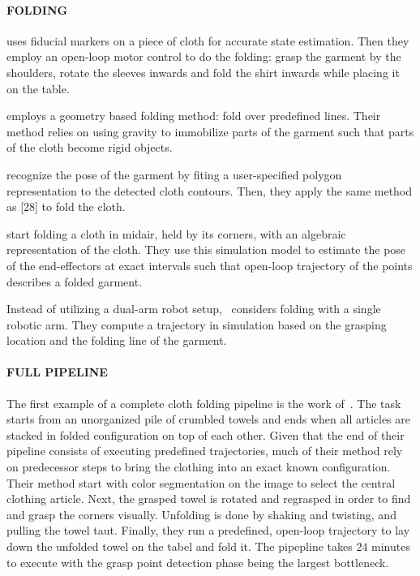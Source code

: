 \documentclass[\home/main.tex]{subfiles}
\begin{document}
    \paragraph{FOLDING}
	\autocite{Bersch2011} uses fiducial markers on a piece of cloth for accurate state estimation. Then they employ an open-loop motor control to do the folding: grasp the garment by the shoulders, rotate the sleeves inwards and fold the shirt inwards while placing it on the table. 

	\autocite{Berg2010} employs a geometry based folding method: fold over predefined lines. Their method relies on using gravity to immobilize parts of the garment such that parts of the cloth become rigid objects. 

	\autocite{Miller2012} recognize the pose of the garment by fiting a user-specified polygon representation to the detected cloth contours. Then, they apply the same method as [28] to fold the cloth.

	\autocite{Yamakawa2011} start folding a cloth in midair, held by its corners, with an algebraic representation of the cloth. They use this simulation model to estimate the pose of the end-effectors at exact intervals such that open-loop trajectory of the points describes a folded garment. 

	Instead of utilizing a dual-arm robot setup,~\autocite{Petrik2017} considers folding with a single robotic arm. They compute a trajectory in simulation based on the grasping location and the folding line of the garment.


    \paragraph{FULL PIPELINE}
	The first example of a complete cloth folding pipeline is the work of~\textcite{Maitin2010}. The task starts from an unorganized pile of crumbled towels and ends when all articles are stacked in folded configuration on top of each other. Given that the end of their pipeline consists of executing predefined trajectories, much of their method rely on predecessor steps to bring the clothing into an exact known configuration. Their method start with color segmentation on the image to select the central clothing article. Next, the grasped towel is rotated and regrasped in order to find and grasp the corners visually. Unfolding is done by shaking and twisting, and pulling the towel taut. Finally, they run a predefined, open-loop trajectory to lay down the unfolded towel on the tabel and fold it. The pipepline takes $24$ minutes to execute with the grasp point detection phase being the largest bottleneck.
\end{document}
